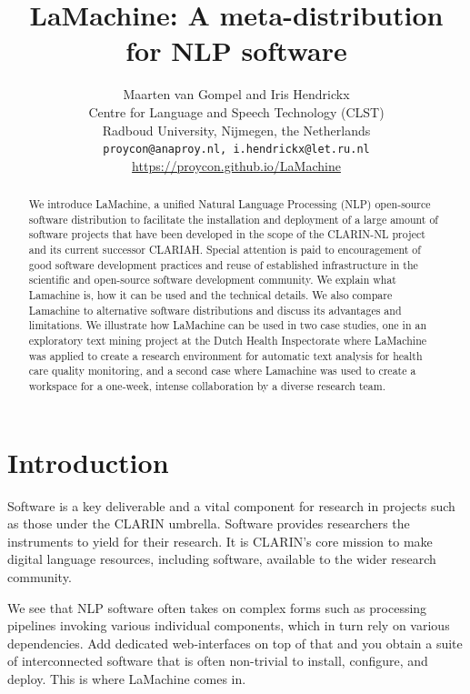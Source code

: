 \documentclass[a4paper,11pt]{article}
\title{LaMachine: A meta-distribution for NLP software}
\author{Maarten van Gompel  and Iris Hendrickx\\
  Centre for Language and Speech Technology (CLST) \\
  Radboud University, Nijmegen, the Netherlands \\
  {\tt proycon@anaproy.nl, i.hendrickx@let.ru.nl} \\ %
  \url{https://proycon.github.io/LaMachine}
}
\date{}
\begin{document}
\maketitle

\begin{abstract}
We introduce LaMachine, a unified Natural Language Processing (NLP) open-source software distribution to facilitate the
installation and deployment of a large amount of software projects that have been developed in the scope of the
CLARIN-NL project and its current successor CLARIAH. Special attention is paid to encouragement of good software
development practices and reuse of established infrastructure in the scientific and open-source software development
community. We explain what Lamachine is, how it can be used and the technical details. We also compare Lamachine to alternative software distributions and discuss its advantages and limitations. We illustrate how LaMachine can be used in two case studies, one in an exploratory text mining project at the Dutch Health Inspectorate where LaMachine was applied to create a research environment for automatic text analysis for health care quality monitoring, and a second case where Lamachine was used to create a workspace for a one-week, intense collaboration by a diverse research team.
\end{abstract}

\section{Introduction}
\label{sec:intro}

Software is a key deliverable and a vital component for research in projects such as those under the CLARIN umbrella. Software provides researchers the instruments to yield for their research. It is CLARIN's core mission to make
digital language resources, including software, available to the wider research community.

We see that NLP software often takes on complex forms such as processing pipelines invoking various individual
components, which in turn rely on various dependencies. Add dedicated web-interfaces on top of that and you obtain a
suite of interconnected software that is often non-trivial to install, configure, and deploy. This is where LaMachine
comes in.
\end{document}
